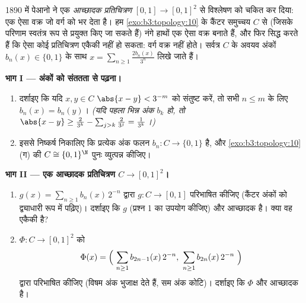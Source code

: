 \begin{problem}\label{pb:b3:topology:1}
1890 में पेआनो ने एक \emph{ आच्छादक प्रतिचित्रण} $[0,1] \to [0,1]^2$ से
विश्लेषण को चकित कर दिया: एक ऐसा वक्र जो वर्ग को भर देता है। हम
\cref{exo:b3:topology:10} के कैंटर समुच्चय $C$ से (जिसके परिणाम स्वतंत्र रूप से
प्रयुक्त किए जा सकते हैं) नंगे हाथों एक ऐसा वक्र बनाते हैं, और
फिर सिद्ध करते हैं कि ऐसा कोई प्रतिचित्रण एकैकी नहीं हो सकता:
वर्ग वक्र नहीं होते। सर्वत्र $C$ के अवयव अंकों $b_n(x) \in
\{0, 1\}$ के साथ
$x =
\sum_{n \geq 1} \frac{2b_n(x)}{3^n}$ लिखे जाते हैं।

\medskip
\noindent\textbf{भाग I --- अंकों को संततता से पढ़ना।}
\begin{enumerate}
  \item दर्शाइए कि यदि $x, y \in C$ $\abs{x - y} <
        3^{-m}$ को संतुष्ट करें, तो सभी $n \leq m$
        के लिए $b_n(x) = b_n(y)$। \emph{(यदि पहला भिन्न अंक $b_k$ हो, तो
        $\abs{x - y} \geq \frac{2}{3^k} - \sum_{j>k}\frac2{3^j}
        = \frac1{3^k}$।)}
  \item इससे निष्कर्ष निकालिए कि प्रत्येक अंक फलन $b_n \colon C \to \{0,
        1\}$  है,
        और \cref{exo:b3:topology:10}(ग) की  $C
        \cong \{0,1\}^\N$ पुनः व्युत्पन्न कीजिए।
\end{enumerate}

\medskip
\noindent\textbf{भाग II --- एक  आच्छादक प्रतिचित्रण $C \to
[0,1]^2$।}
\begin{enumerate}[resume]
  \item $g(x) = \sum_{n\geq1}
        b_n(x)\,2^{-n}$ द्वारा $g \colon C \to [0,1]$ परिभाषित कीजिए (कैंटर अंकों को
        द्व्याधारी रूप में पढ़िए)। दर्शाइए कि $g$  (प्रश्न
        1 का उपयोग कीजिए) और आच्छादक है। क्या वह एकैकी है?
  \item $\Phi \colon C \to [0,1]^2$ को
        \[
        \Phi(x) = \Bigl(\ \sum_{n\geq1} b_{2n-1}(x)\,2^{-n},\
        \sum_{n\geq1} b_{2n}(x)\,2^{-n}\ \Bigr)
        \]
        द्वारा परिभाषित कीजिए (विषम अंक भुजाक्ष देते हैं, सम अंक
        कोटि)। दर्शाइए कि $\Phi$  और आच्छादक है।
\end{enumerate}


\end{problem}
